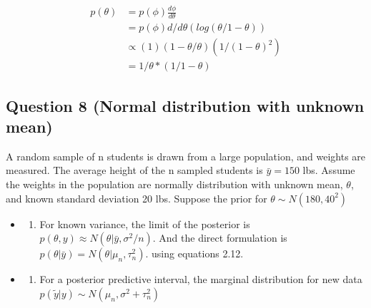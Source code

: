 \documentclass[
]{book}
\providecommand{\tightlist}{%
  \setlength{\itemsep}{0pt}\setlength{\parskip}{0pt}}
\theoremstyle{definition}
\theoremstyle{definition}
\theoremstyle{definition}
\theoremstyle{definition}
\theoremstyle{remark}
\begin{document}
\[
\begin{aligned}
p(\theta)&=p(\phi)\frac{d\phi}{d\theta}\\
&= p(\phi)d/d\theta (log(\theta/1-\theta))\\
&\propto (1) (1-\theta / \theta)(1/(1-\theta)^2) \\
&= 1/\theta *(1/1-\theta) 
\end{aligned}
\]

\hypertarget{question-8-normal-distribution-with-unknown-mean}{%
\subsection*{Question 8 (Normal distribution with unknown mean)}\label{question-8-normal-distribution-with-unknown-mean}}

A random sample of n students is drawn from a large population, and weights are measured. The average height of the n sampled students is \(\bar{y}= 150\) lbs. Assume the weights in the population are normally distribution with unknown mean, \(\theta\), and known standard deviation 20 lbs. Suppose the prior for \(\theta \sim N(180, 40^2)\)

\begin{itemize}
\item
  \begin{enumerate}
  \def\labelenumi{(\alph{enumi})}
  \tightlist
  \item
    For known variance, the limit of the posterior is \(p(\theta,y)\approx N(\theta| \bar{y}, \sigma^2/n)\). And the direct formulation is \(p(\theta | \bar{y})= N(\theta | \mu_n,\tau_n^2).\) using equations 2.12.
  \end{enumerate}
\item
  \begin{enumerate}
  \def\labelenumi{(\alph{enumi})}
  \setcounter{enumi}{1}
  \tightlist
  \item
    For a posterior predictive interval, the marginal distribution for new data \(p(\tilde{y} | y) \sim N(\mu_n, \sigma^2+\tau_n^2)\)
  \end{enumerate}
\end{itemize}
\end{document}
